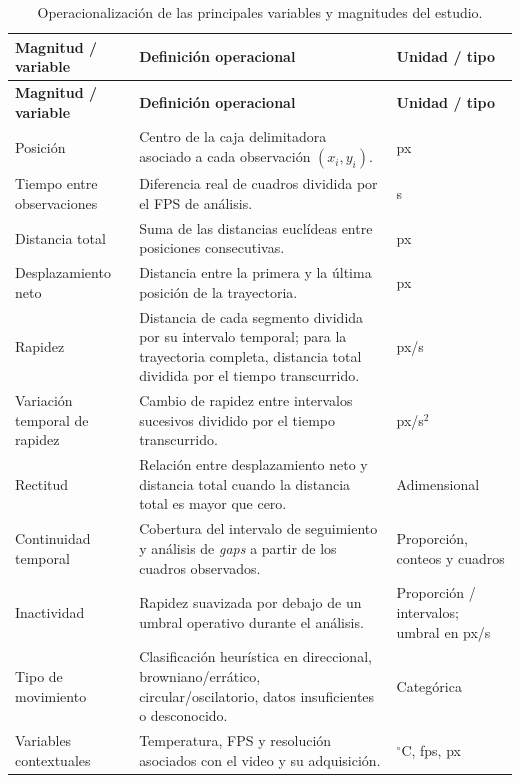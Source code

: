 \begingroup
\footnotesize
\renewcommand{\arraystretch}{1.12}
\setlength{\tabcolsep}{3.5pt}
\setlength{\LTleft}{0pt}
\setlength{\LTright}{\fill}
\begin{longtable}{@{}>{\raggedright\arraybackslash}p{}>{\raggedright\arraybackslash}p{}>{\raggedright\arraybackslash}p{}@{}}
\caption{Operacionalización de las principales variables y magnitudes del estudio.}
\label{tab:operacionalizacion}\\
\toprule
\textbf{Magnitud / variable} & \textbf{Definición operacional} & \textbf{Unidad / tipo} \\
\midrule
\endfirsthead
\toprule
\textbf{Magnitud / variable} & \textbf{Definición operacional} & \textbf{Unidad / tipo} \\
\midrule
\endhead
\bottomrule
\endfoot

Posición &
Centro de la caja delimitadora asociado a cada observación $(x_i,y_i)$. &
px \\

Tiempo entre observaciones &
Diferencia real de cuadros dividida por el FPS de análisis. &
s \\

Distancia total &
Suma de las distancias euclídeas entre posiciones consecutivas. &
px \\

Desplazamiento neto &
Distancia entre la primera y la última posición de la trayectoria. &
px \\

Rapidez &
Distancia de cada segmento dividida por su intervalo temporal; para la trayectoria completa, distancia total dividida por el tiempo transcurrido. &
px/s \\

Variación temporal de rapidez &
Cambio de rapidez entre intervalos sucesivos dividido por el tiempo transcurrido. &
px/s$^2$ \\

Rectitud &
Relación entre desplazamiento neto y distancia total cuando la distancia total es mayor que cero. &
Adimensional \\

Continuidad temporal &
Cobertura del intervalo de seguimiento y análisis de \textit{gaps} a partir de los cuadros observados. &
Proporción, conteos y cuadros \\

Inactividad &
Rapidez suavizada por debajo de un umbral operativo durante el análisis. &
Proporción / intervalos; umbral en px/s \\

Tipo de movimiento &
Clasificación heurística en direccional, browniano/errático, circular/oscilatorio, datos insuficientes o desconocido. &
Categórica \\

Variables contextuales &
Temperatura, FPS y resolución asociados con el video y su adquisición. &
$^\circ$C, fps, px \\

\end{longtable}
\endgroup

